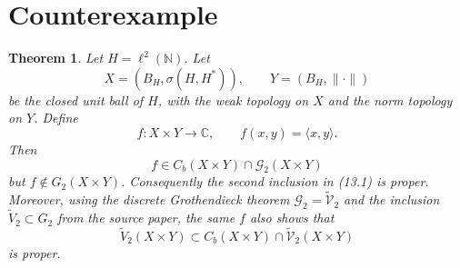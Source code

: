 \documentclass[11pt]{article}
\newtheorem{theorem}{Theorem}
\begin{document}
\section*{Counterexample}

\begin{theorem}
Let \(H=\ell^2(\mathbb N)\). Let
\[
X=(B_H,\sigma(H,H^*)),\qquad Y=(B_H,\|\cdot\|)
\]
be the closed unit ball of \(H\), with the weak topology on \(X\) and the norm
topology on \(Y\). Define
\[
f:X\times Y\to \mathbb C,\qquad f(x,y)=\langle x,y\rangle .
\]
Then
\[
f\in C_b(X\times Y)\cap \mathcal G_2(X\times Y)
\]
but \(f\notin G_2(X\times Y)\). Consequently the second inclusion in (13.1) is
proper. Moreover, using the discrete Grothendieck theorem
\(\mathcal G_2=\widetilde{\mathcal V}_2\) and the inclusion
\(\widetilde V_2\subset G_2\) from the source paper, the same \(f\) also shows
that
\[
\widetilde V_2(X\times Y)
\subset C_b(X\times Y)\cap \widetilde{\mathcal V}_2(X\times Y)
\]
is proper.
\end{theorem}
\end{document}
